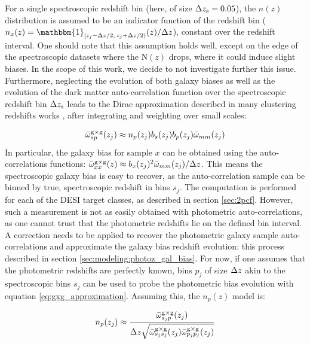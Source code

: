 For a single spectroscopic redshift bin (here, of size $\Delta z_\mathrm{s}=0.05$), the $n(z)$ distribution is assumed to be an indicator function of the redshift bin ($n_x(z)=\mathbbm{1}_{[z_j-\dz/2,\,z_j+\dz/2)}(z)/\dz$), constant over the redshift interval. One should note that this assumption holds well, except on the edge of the spectroscopic datasets where the $\mathrm{N}(z)$ drops, where it could induce slight biases. In the scope of this work, we decide to not investigate further this issue. Furthermore, neglecting the evolution of both galaxy biases as well as the evolution of the dark matter auto-correlation function over the spectroscopic redshift bin $\Delta z_\mathrm{s}$ leads to  the Dirac approximation described in many clustering redshifts works \cite{Giannini2024DESClusterSOMPZ,KidsCrossCorrvdB2020,EuclidClusterRedshifts2025}, after integrating and weighting over small scales:

\begin{equation}\label{eq:gxg_approximation}
    \bar{\omega}^{\mathrm{g}\times \mathrm{g}}_{sp}(z_j)\approx n_p(z_j)b_s(z_j)b_p(z_j)\bar{\omega}_{mm}(z_j)
\end{equation}
\noindent In particular, the galaxy bias for sample $x$ can be obtained using the auto-correlations functions: $\bar{\omega}^{\mathrm{g}\times \mathrm{g}}_{xx}(z)\approx b_x(z_j)^2\bar{\omega}_{mm}(z_j)/\Delta z$.
This means the spectroscopic galaxy bias is easy to recover, as the auto-correlation sample can be binned by true, spectroscopic redshift in bins $s_j$. 
The computation is performed for each of the DESI target classes, as described in section \ref{sec:2pcf}. 
However, such a measurement is not as easily obtained with photometric auto-correlations, as one cannot trust that the photometric redshifts lie on the defined bin interval.
A correction needs to be applied to recover the photometric galaxy sample auto-correlations and approximate the galaxy bias redshift evolution: this process described in section \ref{sec:modeling:photoz_gal_bias}. 
For now, if one assumes that the photometric redshifts are perfectly known, bins $p_j$ of size $\Delta z$ akin to the spectroscopic bins $s_j$ can be used to probe the photometric bias evolution with equation \ref{eq:gxg_approximation}. 
Assuming this, the $n_p(z)$ model is:

\begin{equation}\label{eq:nz}
    n_p(z_j)\approx\frac{\bar{\omega}_{s_jp}^{\mathrm{g}\times \mathrm{g}}(z_j)}{\Delta z\sqrt{\bar{\omega}_{s_js_j}^{\mathrm{g}\times \mathrm{g}}(z_j)\bar{\omega}_{p_jp_j}^{\mathrm{g}\times \mathrm{g}}(z_j)}}
\end{equation}

